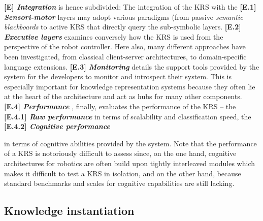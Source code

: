 \documentclass[journal]{IEEEtran}
\newcommand{\taxon}[2]{%
    \textbf{[#1] \emph{#2}}
}
\begin{document}
\taxon{E}{Integration} is hence subdivided: The integration of the KRS with the
\taxon{E.1}{Sensori-motor} layers may adopt various paradigms (from passive
\emph{semantic blackboards} to active KRS that directly query the sub-symbolic
layers. \taxon{E.2}{Executive layers} examines conversely how the KRS is used
from the perspective of the robot controller. Here also, many different
approaches have been investigated, from classical client-server architectures, 
to domain-specific language extensions. \taxon{E.3}{Monitoring} details the 
support tools provided by the system for the developers to monitor and 
introspect their system. This is especially important for knowledge representation 
systems because they often lie at the heart of the architecture and act as hubs 
for many other components. \taxon{E.4}{Performance}, finally, evaluates the
performance of the KRS -- the \taxon{E.4.1}{Raw performance} in terms of 
scalability and classification speed, the \taxon{E.4.2}{Cognitive performance} 
in terms of cognitive abilities provided by the system. Note that the performance 
of a KRS is notoriously difficult to assess since, on the one hand, cognitive 
architectures for robotics are often build upon tightly interleaved modules 
which makes it difficult to test a KRS in isolation, and on the other hand, 
because standard benchmarks and scales for cognitive capabilities are still 
lacking.


\subsection{Knowledge instantiation}
\end{document}
